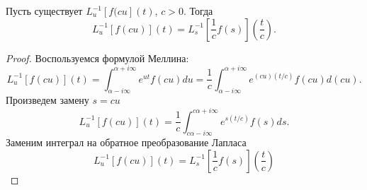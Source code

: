 \documentclass[../paper.tex]{subfiles}
\begin{document}
\begin{Lem}
\label{laplace-var-change}
Пусть существует $L^{-1}_u [f(cu](t)$, $c>0$.
Тогда
\[
    L^{-1}_u \left[ f(cu) \right](t) = L^{-1}_s \left[ \frac{1}{c}f(s) \right]\left(\frac{t}{c}\right)
.\]
\end{Lem}
\begin{proof}
Воспользуемся формулой Меллина:
\[
	L^{-1}_u\left[f\left(cu\right)\right](t) 
	= \int_{\alpha-i\infty}^{\alpha+i\infty} e^{ut}f(cu)du 
	= \frac{1}{c} \int_{\alpha-i\infty}^{\alpha+i\infty} e^{\left(cu\right) (t/c)} f(cu) d\left(cu\right)
.\]
Произведем замену $s=cu$
\[
	L^{-1}_u\left[f\left(cu\right)\right](t)
	= \frac{1}{c} \int_{c\alpha-i\infty}^{c\alpha+i\infty} e^{s (t/c)} f(s) ds
.\]
Заменим интеграл на обратное преобразование Лапласа
\[
	L^{-1}_u\left[f\left(cu\right)\right](t)
	= L^{-1}_s \left[ \frac{1}{c} f(s) \right]\left( \frac{t}{c} \right)  
\]
\end{proof}
\end{document}
